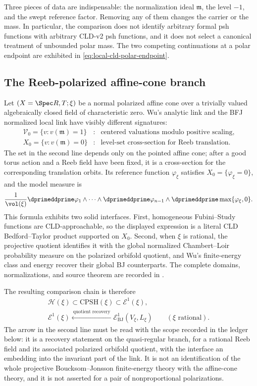 Three pieces of data are indispensable: the normalization ideal
$\mathfrak m$, the level $-1$, and the swept reference factor.  Removing
any of them changes the carrier or the mass.  In particular, the comparison
does not identify arbitrary formal psh functions with arbitrary CLD-v2 psh
functions, and it does not select a canonical treatment of unbounded polar
mass.  The two competing continuations at a polar endpoint are exhibited in
\eqref{eq:local-cld-polar-endpoint}.

\subsection{The Reeb-polarized affine-cone branch}
\label{subsec:dict-reeb}

Let $(X=\Spec R,T;\xi)$ be a normal polarized affine cone over a trivially
valued algebraically closed field of characteristic zero.  Wu's analytic
link and the BFJ normalized local link have visibly different signatures:
\[
 \begin{array}{ccl}
  \mathcal V_0=\{v:v(\mathfrak m)=1\}
   &:&\text{centered valuations modulo positive scaling},\\[1mm]
  X_0=\{v:v(\mathfrak m)=0\}
   &:&\text{level-set cross-section for Reeb translation}.
 \end{array}
\]
The set in the second line depends only on the pointed affine cone; after a
good torus action and a Reeb field have been fixed, it is a cross-section for
the corresponding translation orbits.  Its reference function
$\varphi_\xi$ satisfies
$X_0=\{\varphi_\xi=0\}$, and the model measure is
\[
 \frac{1}{\vol(\xi)}
 \dprimeddprime\varphi_1\wedge\cdots\wedge
 \dprimeddprime\varphi_{n-1}\wedge
 \dprimeddprime\max\{\varphi_\xi,0\}.
\]
This formula exhibits two solid interfaces.  First, homogeneous
Fubini--Study functions are CLD-approachable, so the displayed expression is
a literal CLD Bedford--Taylor product supported on $X_0$.  Second, when
$\xi$ is rational, the projective quotient identifies it with the global
normalized Chambert--Loir probability measure on the polarized orbifold
quotient, and Wu's finite-energy class and energy recover their global BJ
counterparts.  The complete domains,
normalizations, and source theorem are recorded in
.

The resulting comparison chain is therefore
\[
 \begin{gathered}
  \mathcal H(\xi)
  \subset\mathrm{CPSH}(\xi)
  \subset\mathcal E^1(\xi),
  \\[1mm]
  \mathcal E^1(\xi)
  \xleftarrow{\ \text{quotient recovery}\ }
  \mathcal E^1_{\mathrm{BJ}}(V_\xi,L_\xi)
  \qquad(\xi\text{ rational}).
 \end{gathered}
\]
The arrow in the second line must be read with the scope recorded in the
ledger below: it is a recovery statement on the quasi-regular branch, for a
rational Reeb field and its associated polarized orbifold quotient, with the
interface an embedding into the invariant part of the link.  It is not an
identification of the whole projective Boucksom--Jonsson finite-energy
theory with the affine-cone theory, and it is not asserted for a pair of
nonproportional polarizations.

